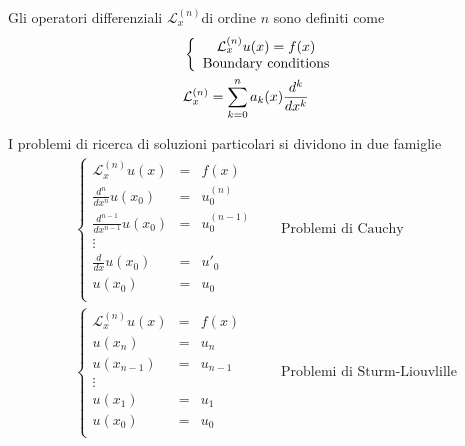 Gli operatori differenziali $\mathcal{L}_x^{(n)}$di ordine $n$ sono definiti come
\begin{align}
	&\left\{ \begin{array}{cc} \mathcal{L}_x^{(n)} u(x) = f(x)\\ \text{Boundary conditions} \end{array} \right.\\
	&\mathcal{L}_x^{(n)} = \sum_{k=0}^{n} a_k(x) \frac{d^k}{dx^k}
\end{align}


I problemi di ricerca di soluzioni particolari si dividono in due famiglie
\begin{align}
	&\left\{
	\begin{array}{ccc}
		\mathcal{L}_x^{(n)} u(x) &= &f(x)\\
		\frac{d^n}{dx^n}u(x_0) &= &u^{(n)}_0\\
		\frac{d^{n-1}}{dx^{n-1}}u(x_0) &= &u^{(n-1)}_0\\
		\vdots\\
		\frac{d}{dx}u(x_0) &= &u'_0\\
		u(x_0) &= &u_0\\
	\end{array}
	\right. \quad &\text{Problemi di Cauchy}\\
	&\left\{
	\begin{array}{ccc}
		\mathcal{L}_x^{(n)} u(x) &= &f(x)\\
		u(x_n) &= &u_n\\
		u(x_{n-1}) &= &u_{n-1}\\
		\vdots\\
		u(x_1) &= &u_1\\
		u(x_0) &= &u_0\\
	\end{array}
	\right. \quad &\text{Problemi di Sturm-Liouvlille}
\end{align}

